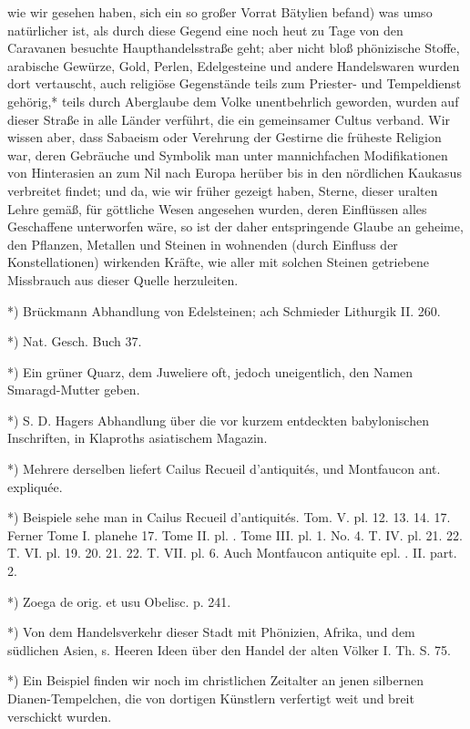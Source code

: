 \documentclass[a4paper, 11pt, oneside, polutonikogreek, german]{article}
\begin{document}
wie wir gesehen haben, sich ein so großer Vorrat Bätylien befand) was umso natürlicher ist, als durch diese Gegend eine noch heut zu Tage von den Caravanen besuchte Haupthandelsstraße geht; aber nicht bloß phönizische Stoffe, arabische Gewürze, Gold, Perlen, Edelgesteine und andere Handelswaren wurden dort vertauscht, auch religiöse Gegenstände teils zum Priester- und Tempeldienst gehörig,* teils durch Aberglaube dem Volke unentbehrlich geworden, wurden auf dieser Straße in alle Länder verführt, die ein gemeinsamer Cultus verband. Wir wissen aber, dass Sabaeism oder Verehrung der Gestirne die früheste Religion war, deren Gebräuche und Symbolik man unter mannichfachen Modifikationen von Hinterasien an zum Nil nach Europa herüber bis in den nördlichen Kaukasus verbreitet findet; und da, wie wir früher gezeigt haben, Sterne, dieser uralten Lehre gemäß, für göttliche Wesen angesehen wurden, deren Einflüssen alles Geschaffene unterworfen wäre, so ist der daher entspringende Glaube an geheime, den Pflanzen, Metallen und Steinen in wohnenden (durch Einfluss der Konstellationen) wirkenden Kräfte, wie aller mit solchen Steinen getriebene Missbrauch aus dieser Quelle herzuleiten.

*) Brückmann Abhandlung von Edelsteinen; ach Schmieder Lithurgik II. 260.

*) Nat. Gesch. Buch 37.

*) Ein grüner Quarz, dem Juweliere oft, jedoch uneigentlich, den Namen Smaragd-Mutter geben.

*) S. D. Hagers Abhandlung über die vor kurzem entdeckten babylonischen Inschriften, in Klaproths asiatischem Magazin.

*) Mehrere derselben liefert Cailus Recueil d'antiquités, und Montfaucon ant. expliquée.

*) Beispiele sehe man in Cailus Recueil d'antiquités. Tom. V. pl. 12. 13. 14. 17. Ferner Tome I. planehe 17. Tome II. pl. . Tome III. pl. 1. No. 4. T. IV. pl. 21. 22. T. VI. pl. 19. 20. 21. 22. T. VII. pl. 6. Auch Montfaucon antiquite epl. . II. part. 2.

*) Zoega de orig. et usu Obelisc. p. 241.

*) Von dem Handelsverkehr dieser Stadt mit Phönizien, Afrika, und dem südlichen Asien, s. Heeren Ideen über den Handel der alten Völker I. Th. S. 75.

*) Ein Beispiel finden wir noch im christlichen Zeitalter an jenen silbernen Dianen-Tempelchen, die von dortigen Künstlern verfertigt weit und breit verschickt wurden.
\end{document}
